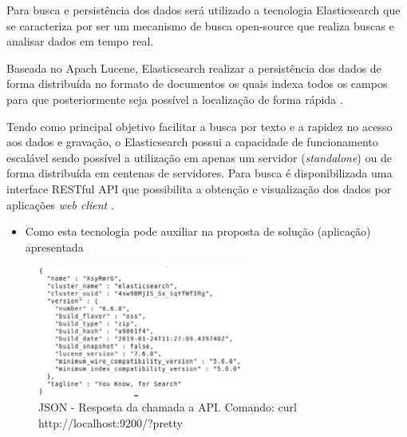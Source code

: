 Para busca e persistência dos dados será utilizado a tecnologia Elasticsearch que se caracteriza por ser um mecanismo de busca open-source que realiza buscas e analisar dados em tempo real.

Baseada no Apach Lucene, Elasticsearch realizar a persistência dos dados de forma distribuída no formato de documentos os quais indexa todos os campos para que posteriormente seja possível a localização de forma rápida \cite{Gormley:2015}.

Tendo como principal objetivo facilitar a busca por texto e a rapidez no acesso aos dados e gravação, 
o Elasticsearch possui a capacidade de funcionamento escalável sendo possível a utilização em apenas um servidor (\textit{standalone}) ou de forma distribuída em centenas de servidores.
Para busca é disponibilizada uma interface RESTful API que possibilita a obtenção e visualização dos dados por aplicações \textit{web client} \cite{Gormley:2015}.

\begin{itemize}
	\item Como esta tecnologia pode auxiliar na proposta de solução (aplicação) apresentada
\end{itemize}
\begin{figure}[!htb]
	\caption{\label{fig_grafico}JSON - Resposta da chamada a API. Comando: curl http://localhost:9200/?pretty}
	\begin{center}
		\includegraphics[width=0.6\textwidth]{imagens/pretty.eps}
	\end{center}
\end{figure}
